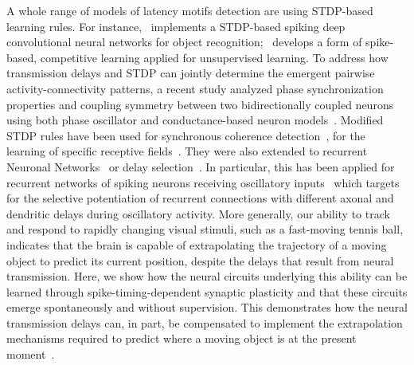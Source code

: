 \documentclass[brainsci, %
               review,submit,pdftex,moreauthors
               ]{Definitions/mdpi}
\begin{document}
A whole range of models of latency motifs detection are using STDP-based learning rules. For instance,~\citep{kheradpisheh_stdp-based_2018} implements a STDP-based spiking deep convolutional neural networks for object recognition;~\citep{tavanaei_representation_2018} develops a form of spike-based, competitive learning applied for unsupervised learning. 
To address  how transmission delays and STDP can jointly determine the emergent pairwise activity-connectivity patterns, a recent study analyzed phase synchronization properties and coupling symmetry between two bidirectionally coupled neurons using both phase oscillator and conductance-based neuron models~\citep{madadi_asl_delay-dependent_2022}.
%
Modified STDP rules have been used for synchronous coherence detection~\citep{perrinet_coherence_2002}, for the learning of specific receptive fields~\citep{perrinet_networks_2001}. They were also extended to recurrent Neuronal Networks~\citep{gilson_stdp_2010} or delay selection~\citep{datadien_right_2011}. In particular, this has been applied for recurrent networks of spiking neurons receiving oscillatory inputs~\citep{kerr_delay_2013} which targets for the selective potentiation of recurrent connections with different axonal and dendritic delays during oscillatory activity. More generally, our ability to track and respond to rapidly changing visual stimuli, such as a fast-moving tennis ball, indicates that the brain is capable of extrapolating the trajectory of a moving object to predict its current position, despite the delays that result from neural transmission. Here, we show how the neural circuits underlying this ability can be learned through spike-timing-dependent synaptic plasticity and that these circuits emerge spontaneously and without supervision. This demonstrates how the neural transmission delays can, in part, be compensated to implement the extrapolation mechanisms required to predict where a moving object is at the present moment~\citep{burkitt_predictive_2021}.
\end{document}
